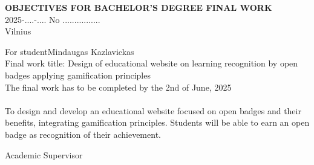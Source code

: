 %
\vspace{6pt}
%
\begin{center}
{\textbf {OBJECTIVES FOR BACHELOR'S DEGREE FINAL WORK}}\\
{\fontsize{11}{11} 2025-....-.... No ................}\\
{\fontsize{11}{11} Vilnius}\\
\end{center}
%
\noindent
For student\hspace{0.25\textwidth}Mindaugas Kazlavickas\\
%
\noindent
Final work title: Design of educational website on learning recognition by open badges applying gamification principles\\
%
\noindent
The final work has to be completed by the 2nd of June, 2025\\
\noindent
{}\\
\fontsize{11}{11}To design and develop an educational website focused on open badges and their benefits, integrating gamification principles. Students will be able to earn an open badge as recognition of their achievement.\\[0.5\baselineskip]
%
%
\begin{minipage}[t]{0.3\textwidth}
Academic Supervisor
\end{minipage}
